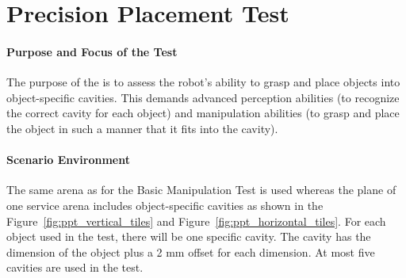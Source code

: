 \newpage
\section{Precision Placement Test}

\paragraph{Purpose and Focus of the Test}
The purpose of the  is to assess the robot's ability to grasp and place objects into object-specific cavities. This demands advanced perception abilities (to recognize the correct cavity for each object) and manipulation abilities (to grasp and place the object in such a manner that it fits into the cavity).

\paragraph{Scenario Environment}
The same arena as for the Basic Manipulation Test is used whereas the plane of one service arena includes object-specific cavities as shown in the Figure~\ref{fig:ppt_vertical_tiles} and Figure~\ref{fig:ppt_horizontal_tiles}. For each object used in the test, there will be one specific cavity. The cavity has the dimension of the object plus a 2 mm offset for each dimension. At most five cavities are used in the test.


